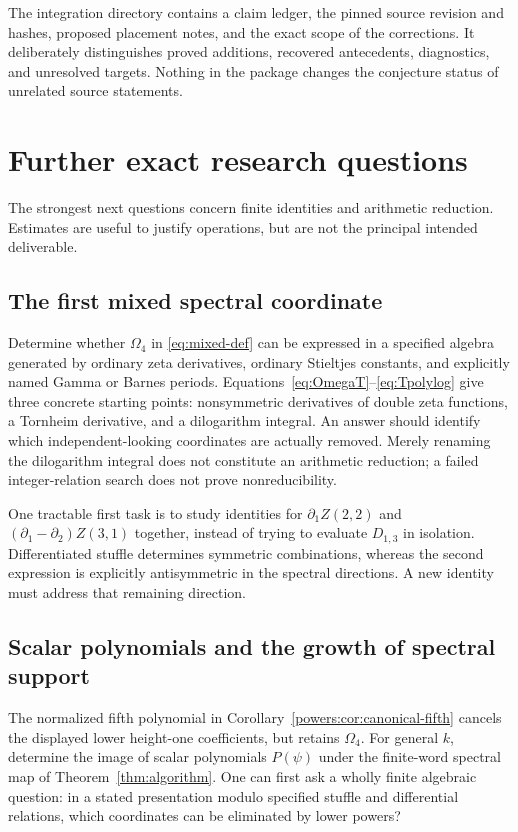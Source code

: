 \documentclass[11pt,a4paper]{article}
\numberwithin{equation}{section}
\theoremstyle{definition}
\theoremstyle{remark}
\begin{document}
The integration directory contains a claim ledger, the pinned source
revision and hashes, proposed placement notes, and the exact scope of
the corrections.  It deliberately distinguishes proved additions,
recovered antecedents, diagnostics, and unresolved targets.  Nothing
in the package changes the conjecture status of unrelated source
statements.

\section{Further exact research questions}
\label{sec:questions}

The strongest next questions concern finite identities and arithmetic
reduction.  Estimates are useful to justify operations, but are not
the principal intended deliverable.

\subsection{The first mixed spectral coordinate}

Determine whether $\Omega_4$ in \eqref{eq:mixed-def} can be expressed
in a specified algebra generated by ordinary zeta derivatives,
ordinary Stieltjes constants, and explicitly named Gamma or Barnes
periods.  Equations~\eqref{eq:OmegaT}--\eqref{eq:Tpolylog} give
three concrete starting points: nonsymmetric derivatives of double
zeta functions, a Tornheim derivative, and a dilogarithm integral.
An answer should identify which independent-looking coordinates are
actually removed.  Merely renaming the dilogarithm integral does not
constitute an arithmetic reduction; a failed integer-relation search
does not prove nonreducibility.

One tractable first task is to study identities for
$\partial_1Z(2,2)$ and $(\partial_1-\partial_2)Z(3,1)$ together,
instead of trying to evaluate $D_{1,3}$ in isolation.  Differentiated
stuffle determines symmetric combinations, whereas the second
expression is explicitly antisymmetric in the spectral directions.
A new identity must address that remaining direction.

\subsection{Scalar polynomials and the growth of spectral support}

The normalized fifth polynomial in
Corollary~\ref{powers:cor:canonical-fifth} cancels the displayed
lower height-one coefficients, but retains $\Omega_4$.  For general
$k$, determine the image of scalar polynomials
$P(\psi)$ under the finite-word spectral map of
Theorem~\ref{thm:algorithm}.  One can first ask a wholly finite
algebraic question: in a stated presentation modulo specified stuffle
and differential relations, which coordinates can be eliminated by
lower powers?
\end{document}
